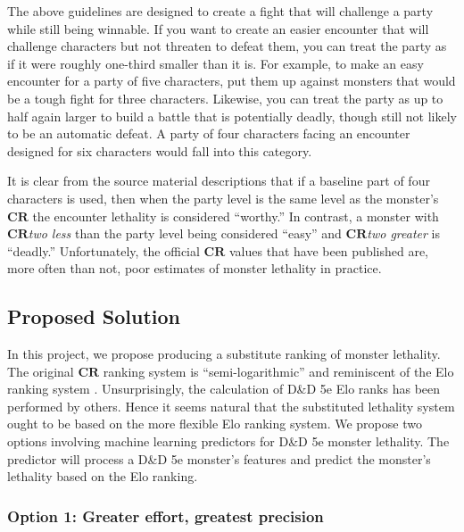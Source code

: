 \documentclass{article}
\newcommand{\CR}{\ensuremath{\mathbf{CR}}\xspace}
\newcommand{\DnD}{D\&D 5e\xspace}
\newcommand{\TierLeast}{\ensuremath{\textsc{Least}}\xspace}
\newcommand{\TierLess}{\ensuremath{\textsc{Less}}\xspace}
\newcommand{\TierFair}{\ensuremath{\textsc{Fair}}\xspace}
\newcommand{\TierMore}{\ensuremath{\textsc{More}}\xspace}
\newcommand{\TierMost}{\ensuremath{\textsc{Most}}\xspace}
\begin{document}
\begin{displayquote}
	The above guidelines are designed to create a fight that will challenge a party while still being winnable.
	If you want to create an easier encounter that will challenge characters but not threaten to defeat them, you can treat the party as if it were roughly one-third smaller than it is.
	For example, to make an easy encounter for a party of five characters, put them up against monsters that would be a tough fight for three characters.
	Likewise, you can treat the party as up to half again larger to build a battle that is potentially deadly, though still not likely to be an automatic defeat.
	A party of four characters facing an encounter designed for six characters would fall into this category.
\end{displayquote}

It is clear from the source material descriptions that if a baseline part of four characters is used, then when the party level is the same level as the monster's \CR the encounter lethality is considered ``worthy.'' In contrast, a monster with \CR \emph{two less} than the party level being considered ``easy'' and \CR \emph{two greater} is ``deadly.''
Unfortunately, the official \CR values that have been published are, more often than not, poor estimates of monster lethality in practice.


\subsection{Proposed Solution}

In this project, we propose producing a substitute ranking of monster lethality.
The original \CR ranking system is ``semi-logarithmic'' and reminiscent of the Elo ranking system \cite{elo1978rating}.
Unsurprisingly, the calculation of \DnD Elo ranks has been performed by others.
Hence it seems natural that the substituted lethality system ought to be based on the more flexible Elo ranking system.
We propose two options involving machine learning predictors for \DnD monster lethality.
The predictor will process a \DnD monster's features and predict the monster's lethality based on the Elo ranking.


\subsubsection{\label{sec:option-1}Option 1: Greater effort, greatest precision}
\end{document}
